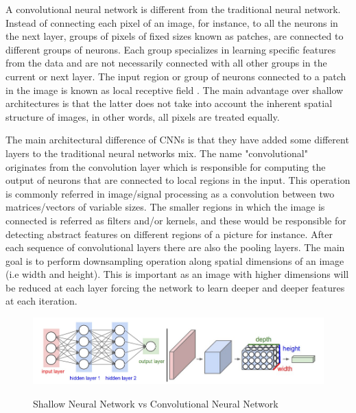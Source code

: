 A convolutional neural network is different from the traditional neural network. Instead of connecting each pixel of an image, for instance, to all the neurons in the next layer, groups of pixels of fixed sizes known as patches, are connected to different groups of neurons. Each group specializes in learning specific features from the data and are not necessarily connected with all other groups in the current or next layer. The input region or group of neurons connected to a patch in the image is known as local receptive field \cite{nielsen2016}. The main advantage over shallow architectures is that the latter does not take into account the inherent spatial structure of images, in other words, all pixels are treated equally.

The main architectural difference of CNNs is that they have added some different layers to the traditional neural networks mix. The name "convolutional" originates from the convolution layer which is responsible for computing the output of neurons that are connected to local regions in the input. This operation is commonly referred in image/signal processing as a convolution between two matrices/vectors of variable sizes. The smaller regions in which the image is connected is referred as filters and/or kernels, and these would be responsible for detecting abstract features on different regions of a picture for instance. After each sequence of convolutional layers there are also the pooling layers. The main goal is to perform downsampling operation along spatial dimensions of an image (i.e width and height). This is important as an image with higher dimensions will be reduced at each layer forcing the network to learn deeper and deeper features at each iteration.

\begin{figure}[!h]
\centering
	\includegraphics[scale=0.6]{conv.png}
\caption{Shallow Neural Network vs Convolutional Neural Network}
\cite{stanford2016}
\label{fig:conv}
\end{figure}


